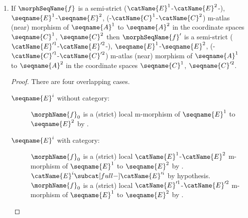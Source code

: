\documentclass{article}
\begin{document}
\begin{lemma}
\begin{enumerate}
\begin{proof}
\begin{description}
\item[$\seqname{C}^i$ without category:]
\leavevmode
$\morphName{f}_0$ is a local m-morphism of $\seqname{C}^1$ to
$\seqname{C}^2$ by .
$\seqname{C}^1 \submod[strict-] \seqname{C}^2$ by .
$\Set(\seqname{C}^2)$ is a model neighborhood of $\seqname{C}^2$ by .
The result follows by \cref{mod:sheaf} (Restricted sheaf condition) of
{
  \showlabelsinline
  \cref{def:modsub}
}.

\item[$\seqname{C}^i$ with category:]
\leavevmode
$\morphName{f}_0$ is a local $\catName{C}^1$-$\catName{C}^2$ m-morphism
of $\seqname{C}^1$ to $\seqname{C}^2$ by .
$\catName{C}^1 \subcat[strict-] \catName{C}^2$ by
\cref{def:M-ATLmorphsemi}.  $\catName{E}^2$ satisfies the restricted
sheaf condition by  and the result follows.
\end{description}
\end{proof}

\item
\label{M-ATLmorph:SstrictisSstricttosup}
If $\morphSeqName{f}$ is a semi-strict
\nobreaks
  {
    {($\catName{E}^1$-$\catName{E}^2$-)},
    {$\seqname{E}^1$-$\seqname{E}^2$},
    {(-$\catName{C}^1$-$\catName{C}^2$)}
  }
m-atlas (near) morphism of $\seqname{A}^1$ to $\seqname{A}^2$ in the
coordinate spaces $\seqname{C}^1$, $\seqname{C}^2$ then
$\morphSeqName{f}'$ is a semi-strict
\nobreaks
  {
    {($\catName{E}'^1$-$\catName{E}'^2$-)},
    {$\seqname{E}^1$-$\seqname{E}^2$},
    {(-$\catName{C}'^1$-$\catName{C}'^2$)}
  }
m-atlas (near) morphism of $\seqname{A}^1$ to $\seqname{A}^2$ in the
coordinate spaces $\seqname{C}^1$, $\seqname{C}'^2$.

\begin{proof}
There are four overlapping cases.
\begin{description}
\item[$\seqname{E}^i$ without category:]
$\morphName{f}_0$ is a (strict) local m-morphism of $\seqname{E}^1$ to
$\seqname{E}^2$ by .

\item[$\seqname{E}^i$ with category:]
$\morphName{f}_0$ is a (strict) local $\catName{E}^1$-$\catName{E}^2$
m-morphism of $\seqname{E}^1$ to $\seqname{E}^2$ by
.
$\catName{E}^i \subcat[full-] \catName{E}'^i$ by hypothesis.
$\morphName{f}_0$ is a (strict) local $\catName{E}'^1$-$\catName{E}'^2$
m-morphism of $\seqname{E}^1$ to $\seqname{E}^2$ by
.


\end{description}
\end{proof}
\end{enumerate}
\end{lemma}
\end{document}
